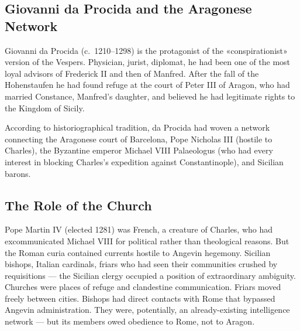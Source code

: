 \subsection{Giovanni da Procida and the Aragonese Network}

Giovanni da Procida (c.~1210–1298) is the protagonist of the
«conspirationist» version of the Vespers. Physician, jurist, diplomat, he
had been one of the most loyal advisors of Frederick II and then of
Manfred. After the fall of the Hohenstaufen he had found refuge at the
court of Peter III of Aragon, who had married Constance, Manfred's
daughter, and believed he had legitimate rights to the Kingdom of Sicily.

According to historiographical tradition, da Procida had woven a network
connecting the Aragonese court of Barcelona, Pope Nicholas III (hostile to
Charles), the Byzantine emperor Michael VIII Palaeologus (who had every
interest in blocking Charles's expedition against Constantinople), and
Sicilian barons.


\subsection{The Role of the Church}

Pope Martin IV (elected 1281) was French, a creature of Charles, who had
excommunicated Michael VIII for political rather than theological reasons.
But the Roman curia contained currents hostile to Angevin hegemony.
Sicilian bishops, Italian cardinals, friars who had seen their communities
crushed by requisitions — the Sicilian clergy occupied a position of
extraordinary ambiguity. Churches were places of refuge and clandestine
communication. Friars moved freely between cities. Bishops had direct
contacts with Rome that bypassed Angevin administration. They were,
potentially, an already-existing intelligence network — but its members
owed obedience to Rome, not to Aragon.

